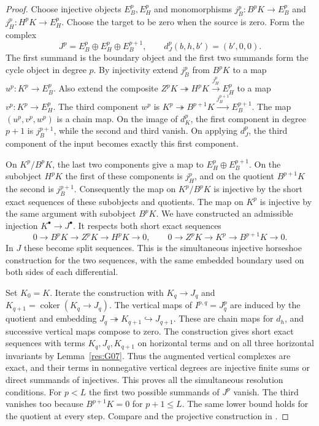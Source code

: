 \begin{proof}
Choose injective objects \(E_B^p,E_H^p\) and monomorphisms
\(j_B^p:B^pK\to E_B^p\) and \(j_H^p:H^pK\to E_H^p\).
Choose the target to be zero when the source is zero. Form the complex
\[
   J^p=E_B^p\oplus E_H^p\oplus E_B^{p+1},
   \qquad d_J^p(b,h,b')=(b',0,0).
\]
The first summand is the boundary object and the first two summands
form the cycle object in degree \(p\). By injectivity extend
\(j_B^p\) from \(B^pK\) to a map \(u^p:K^p\to E_B^p\). Also extend
the composite \(Z^pK\twoheadrightarrow H^pK\xrightarrow{j_H^p}E_H^p\)
to a map \(v^p:K^p\to E_H^p\). The third component \(w^p\) is
\(K^p\twoheadrightarrow B^{p+1}K\xrightarrow{j_B^{p+1}}E_B^{p+1}\).
The map \((u^p,v^p,w^p)\) is a chain map. On the image of \(d_K^p\),
the first component in degree \(p+1\) is \(j_B^{p+1}\), while the
second and third vanish. On applying \(d_J^p\), the third component
of the input becomes exactly this first component.

On \(K^p/B^pK\), the last two components give a map to
\(E_H^p\oplus E_B^{p+1}\). On the subobject \(H^pK\) the first of
these components is \(j_H^p\), and on the quotient \(B^{p+1}K\) the
second is \(j_B^{p+1}\). Consequently the map on \(K^p/B^pK\) is
injective by the short exact sequences of these subobjects and
quotients. The map on \(K^p\) is injective by the same argument with
subobject \(B^pK\). We have constructed an admissible injection
\(K^\bullet\to J^\bullet\). It respects both short exact sequences
\[
 0\to B^pK\to Z^pK\to H^pK\to0,\qquad
 0\to Z^pK\to K^p\to B^{p+1}K\to0 .
\]
In \(J\) these become split sequences. This is the simultaneous
injective horseshoe construction for the two sequences, with the
same embedded boundary used on both sides of each differential.

Set \(K_0=K\). Iterate the construction with \(K_q\to J_q\)
and \(K_{q+1}=\operatorname{coker}(K_q\to J_q)\). The vertical
maps of \(I^{p,q}=J_q^p\) are induced by the quotient and embedding
\(J_q\twoheadrightarrow K_{q+1}\hookrightarrow J_{q+1}\). These
are chain maps for \(d_h\), and successive vertical maps compose
to zero. The construction gives short exact sequences with terms
\(K_q,J_q,K_{q+1}\) on horizontal terms and on all three horizontal
invariants by Lemma~\ref{res:G07}. Thus the augmented
vertical complexes are exact, and their terms in nonnegative
vertical degrees are injective finite sums or direct summands of
injectives. This proves all the simultaneous resolution conditions.
For \(p<L\) the first two possible summands of \(J^p\) vanish.
The third vanishes too because \(B^{p+1}K=0\) for \(p+1\le L\).
The same lower bound holds for the quotient at every step.
Compare \cite[Tag 015I]{stacks-derived} and the projective
construction in \cite[Section 5.7]{weibel}.
\end{proof}

